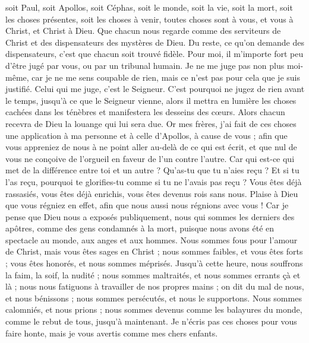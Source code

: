 \begin{multicols}{2}
soit Paul, soit Apollos, soit Céphas, soit le monde, soit la vie, soit la mort, soit les choses présentes, soit les choses à venir, toutes choses sont à vous,
et vous à Christ, et Christ à Dieu.
\VerseOne{}Que chacun nous regarde comme des serviteurs de Christ et des dispensateurs des mystères de Dieu.
Du reste, ce qu’on demande des dispensateurs, c’est que chacun soit trouvé fidèle.
Pour moi, il m’importe fort peu d'être jugé par vous, ou par un tribunal humain. Je ne me juge pas non plus moi-même, car je ne me sens coupable de rien,
mais ce n’est pas pour cela que je suis justifié. Celui qui me juge, c'est le Seigneur.
C'est pourquoi ne jugez de rien avant le temps, jusqu'à ce que le Seigneur vienne, alors il mettra en lumière les choses cachées dans les ténèbres et manifestera les desseins des cœurs. Alors chacun recevra de Dieu la louange qui lui sera due.
Or mes frères, j’ai fait de ces choses une application à ma personne et à celle d’Apollos, à cause de vous ; afin que vous appreniez de nous à ne point aller au-delà de ce qui est écrit, et que nul de vous ne conçoive de l’orgueil en faveur de l’un contre l’autre.
Car qui est-ce qui met de la différence entre toi et un autre ? Qu’as-tu que tu n’aies reçu ? Et si tu l'as reçu, pourquoi te glorifies-tu comme si tu ne l'avais pas reçu ?
Vous êtes déjà rassasiés, vous êtes déjà enrichis, vous êtes devenus rois sans nous. Plaise à Dieu que vous régniez en effet, afin que nous aussi nous régnions avec vous !
Car je pense que Dieu nous a exposés publiquement, nous qui sommes les derniers des apôtres, comme des gens condamnés à la mort, puisque nous avons été en spectacle au monde, aux anges et aux hommes.
Nous sommes fous pour l'amour de Christ, mais vous êtes sages en Christ ; nous sommes faibles, et vous êtes forts ; vous êtes honorés, et nous sommes méprisés.
Jusqu'à cette heure, nous souffrons la faim, la soif, la nudité ; nous sommes maltraités, et nous sommes errants çà et là ;
nous nous fatiguons à travailler de nos propres mains ; on dit du mal de nous, et nous bénissons ; nous sommes persécutés, et nous le supportons.
Nous sommes calomniés, et nous prions ; nous sommes devenus comme les balayures du monde, comme le rebut de tous, jusqu'à maintenant.
Je n'écris pas ces choses pour vous faire honte, mais je vous avertis comme mes chers enfants.

\end{multicols}
